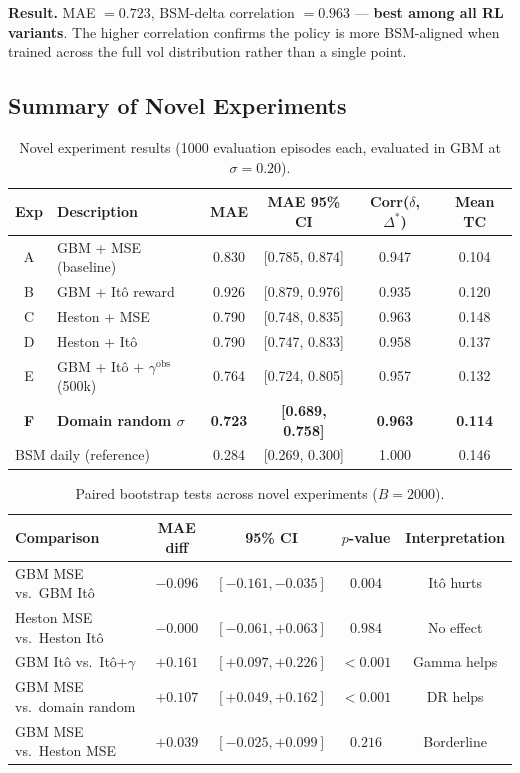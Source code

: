\documentclass[12pt,a4paper]{article}
\begin{document}
\textbf{Result.}  MAE $= 0.723$, BSM-delta correlation $= 0.963$ ---
\textbf{best among all RL variants}.  The higher correlation confirms the
policy is more BSM-aligned when trained across the full vol distribution
rather than a single point.

\subsection{Summary of Novel Experiments}

\begin{table}[H]
  \centering
  \caption{Novel experiment results (1000 evaluation episodes each, evaluated
           in GBM at $\sigma=0.20$).}
  \label{tab:novel}
  \begin{tabular}{clcccc}
    \toprule
    Exp & Description & MAE & MAE 95\% CI & Corr($\delta$, $\Delta^*$) & Mean TC \\
    \midrule
    A & GBM + MSE (baseline) & 0.830 & [0.785, 0.874] & 0.947 & 0.104 \\
    B & GBM + It\^{o} reward & 0.926 & [0.879, 0.976] & 0.935 & 0.120 \\
    C & Heston + MSE         & 0.790 & [0.748, 0.835] & 0.963 & 0.148 \\
    D & Heston + It\^{o}     & 0.790 & [0.747, 0.833] & 0.958 & 0.137 \\
    E & GBM + It\^{o} + $\gamma^{\mathrm{obs}}$ (500k) & 0.764 & [0.724, 0.805] & 0.957 & 0.132 \\
    \textbf{F} & \textbf{Domain random $\sigma$} & \textbf{0.723} & \textbf{[0.689, 0.758]} & \textbf{0.963} & \textbf{0.114} \\
    \midrule
    \multicolumn{2}{l}{BSM daily (reference)} & 0.284 & [0.269, 0.300] & 1.000 & 0.146 \\
    \bottomrule
  \end{tabular}
\end{table}

\begin{table}[H]
  \centering
  \caption{Paired bootstrap tests across novel experiments ($B=2000$).}
  \label{tab:novel_boot}
  \begin{tabular}{lcccc}
    \toprule
    Comparison & MAE diff & 95\% CI & $p$-value & Interpretation \\
    \midrule
    GBM MSE vs.\ GBM It\^{o}        & $-0.096$ & $[-0.161,-0.035]$ & $0.004$  & Itô hurts \\
    Heston MSE vs.\ Heston It\^{o}  & $-0.000$ & $[-0.061,+0.063]$ & $0.984$  & No effect \\
    GBM It\^{o} vs.\ It\^{o}+$\gamma$ & $+0.161$ & $[+0.097,+0.226]$ & $<0.001$ & Gamma helps \\
    GBM MSE vs.\ domain random      & $+0.107$ & $[+0.049,+0.162]$ & $<0.001$ & DR helps \\
    GBM MSE vs.\ Heston MSE         & $+0.039$ & $[-0.025,+0.099]$ & $0.216$  & Borderline \\
    \bottomrule
  \end{tabular}
\end{table}
\end{document}
